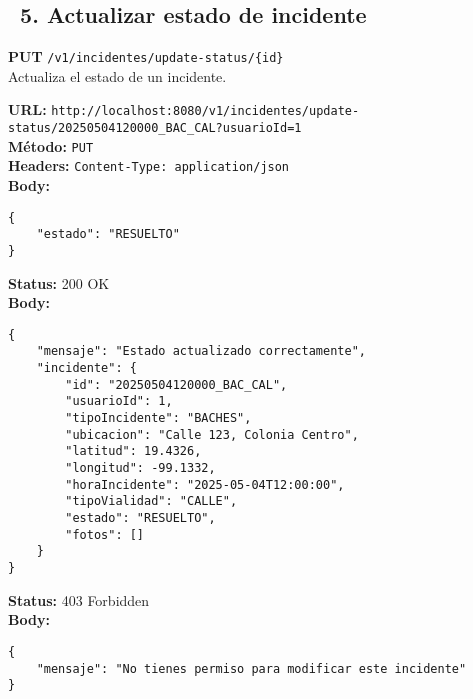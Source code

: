 \subsection*{\faServer\ 5. Actualizar estado de incidente}
\begin{tcolorbox}[endpoint]
    \textbf{PUT} \texttt{/v1/incidentes/update-status/\{id\}}\\
    Actualiza el estado de un incidente.
\end{tcolorbox}

\begin{tcolorbox}[request]
    \textbf{URL:} \textcolor{urlColor}{\texttt{http://localhost:8080/v1/incidentes/update-status/20250504120000\_BAC\_CAL?usuarioId=1}}\\
    \textbf{Método:} \textcolor{methodColor}{\texttt{PUT}}\\
    \textbf{Headers:} \textcolor{headerColor}{\texttt{Content-Type: application/json}}\\
    \textbf{Body:}
    \begin{verbatim}
{
    "estado": "RESUELTO"
}
    \end{verbatim}
\end{tcolorbox}

\begin{tcolorbox}[response]
    \textbf{Status:} 200 OK\\
    \textbf{Body:}
    \begin{verbatim}
{
    "mensaje": "Estado actualizado correctamente",
    "incidente": {
        "id": "20250504120000_BAC_CAL",
        "usuarioId": 1,
        "tipoIncidente": "BACHES",
        "ubicacion": "Calle 123, Colonia Centro",
        "latitud": 19.4326,
        "longitud": -99.1332,
        "horaIncidente": "2025-05-04T12:00:00",
        "tipoVialidad": "CALLE",
        "estado": "RESUELTO",
        "fotos": []
    }
}
    \end{verbatim}
\end{tcolorbox}

\begin{tcolorbox}[response]
    \textbf{Status:} 403 Forbidden\\
    \textbf{Body:}
    \begin{verbatim}
{
    "mensaje": "No tienes permiso para modificar este incidente"
}
    \end{verbatim}
\end{tcolorbox}


